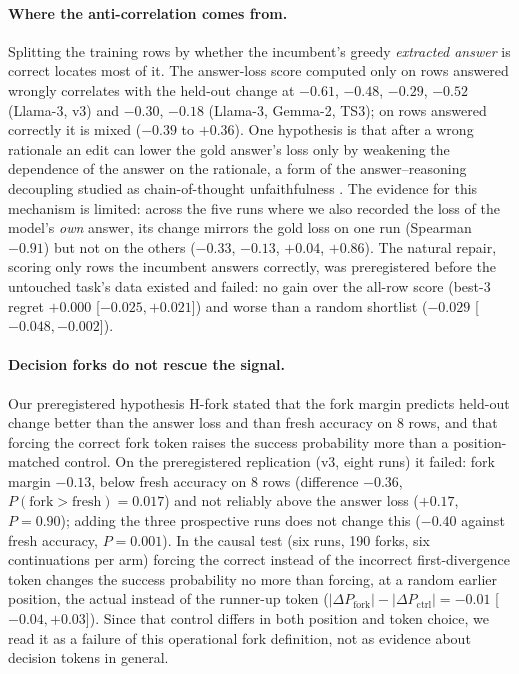 \documentclass{article}
\begin{document}
\paragraph{Where the anti-correlation comes from.} Splitting the training rows by
whether the incumbent's greedy \emph{extracted answer} is correct locates most of it. The
answer-loss score computed only on rows answered wrongly correlates with the held-out
change at $-0.61$, $-0.48$, $-0.29$, $-0.52$ (Llama-3, v3) and $-0.30$, $-0.18$ (Llama-3,
Gemma-2, TS3); on rows answered correctly it is mixed ($-0.39$ to $+0.36$). One hypothesis
is that after a wrong rationale an edit can lower the gold answer's loss only by
weakening the dependence of the answer on the rationale, a form of the answer--reasoning
decoupling studied as chain-of-thought unfaithfulness
\citep{turpin2023unfaithful,lanham2023faithfulness}. The evidence for this mechanism is
limited: across the five runs where we also recorded the loss of the model's \emph{own}
answer, its change mirrors the gold loss on one run (Spearman $-0.91$) but not on the
others ($-0.33$, $-0.13$, $+0.04$, $+0.86$). The natural repair, scoring only rows the
incumbent answers correctly, was preregistered before the untouched task's data existed
and failed: no gain over the all-row score (best-3 regret $+0.000$ [$-0.025,+0.021$]) and
worse than a random shortlist ($-0.029$ [$-0.048,-0.002$]).

\paragraph{Decision forks do not rescue the signal.}
\label{sec:forks}
Our preregistered hypothesis H-fork stated that the fork margin predicts held-out change
better than the answer loss and than fresh accuracy on 8 rows, and that forcing the
correct fork token raises the success probability more than a position-matched control.
On the preregistered replication (v3, eight runs) it failed: fork margin $-0.13$, below
fresh accuracy on 8 rows (difference $-0.36$, $P(\text{fork}>\text{fresh})=0.017$) and not
reliably above the answer loss ($+0.17$, $P=0.90$); adding the three prospective runs
does not change this ($-0.40$ against fresh accuracy, $P=0.001$). In the causal test (six
runs, 190 forks, six continuations per arm) forcing the correct instead of the incorrect
first-divergence token changes the success probability no more than forcing, at a random
earlier position, the actual instead of the runner-up token
($|\Delta P_{\text{fork}}|-|\Delta P_{\text{ctrl}}|=-0.01$ [$-0.04,+0.03$]). Since that
control differs in both position and token choice, we read it as a failure of this
operational fork definition, not as evidence about decision tokens in general.
\end{document}
